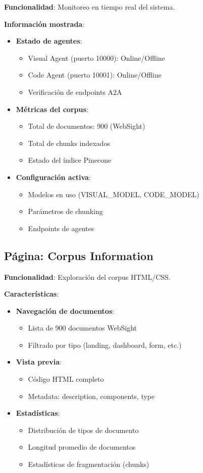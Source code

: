 \documentclass[12pt,a4paper]{article}
\begin{document}
\textbf{Funcionalidad}: Monitoreo en tiempo real del sistema.

\textbf{Información mostrada}:
\begin{itemize}
    \item \textbf{Estado de agentes}:
    \begin{itemize}
        \item Visual Agent (puerto 10000): Online/Offline
        \item Code Agent (puerto 10001): Online/Offline
        \item Verificación de endpoints A2A
    \end{itemize}
    \item \textbf{Métricas del corpus}:
    \begin{itemize}
        \item Total de documentos: 900 (WebSight)
        \item Total de chunks indexados
        \item Estado del índice Pinecone
    \end{itemize}
    \item \textbf{Configuración activa}:
    \begin{itemize}
        \item Modelos en uso (VISUAL\_MODEL, CODE\_MODEL)
        \item Parámetros de chunking
        \item Endpoints de agentes
    \end{itemize}
\end{itemize}

\subsection{Página: Corpus Information}

\textbf{Funcionalidad}: Exploración del corpus HTML/CSS.

\textbf{Características}:
\begin{itemize}
    \item \textbf{Navegación de documentos}:
    \begin{itemize}
        \item Lista de 900 documentos WebSight
        \item Filtrado por tipo (landing, dashboard, form, etc.)
    \end{itemize}
    \item \textbf{Vista previa}:
    \begin{itemize}
        \item Código HTML completo
        \item Metadata: description, components, type
    \end{itemize}
    \item \textbf{Estadísticas}:
    \begin{itemize}
        \item Distribución de tipos de documento
        \item Longitud promedio de documentos
        \item Estadísticas de fragmentación (chunks)
    \end{itemize}
\end{itemize}
\end{document}
